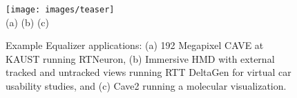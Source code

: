 \documentclass[10pt,journal,compsoc]{IEEEtran}
\begin{document}
%
\IEEEpeerreviewmaketitle

\begin{figure}[ht]\center
  \texttt{[image: images/teaser]} \\
  (a) \hfil \hfil (b) \hfil \hfil (c)
  \vspace{-2mm}
  \caption{Example Equalizer applications: (a) 192 Megapixel CAVE at
    KAUST running RTNeuron, (b) Immersive HMD with external tracked and
    untracked views running RTT DeltaGen for virtual car usability studies,
    and (c) Cave2 running a molecular visualization.}
  \label{FIG_teaser}
\end{figure}

\end{document}

